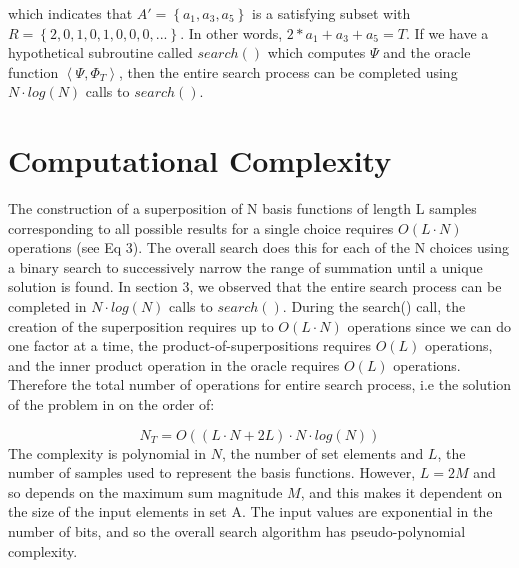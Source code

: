 \documentclass[reqno]{amsart}
\theoremstyle{definition}
\theoremstyle{remark}
\begin{document}
\noindent
which indicates that $A'= \left\{a_1, a_3, a_5 \right\}$ is a satisfying subset with $R = \left\{2,0,1,0,1,0,0,0,...\right\}$. 
In other words, $2*a_1 + a_3 + a_5 = T $. If we have a hypothetical subroutine called $search()$ which computes $\Psi$ and the oracle function
$\left \langle  \Psi, \Phi _T  \right \rangle $, then the entire search process can be completed using $N\cdot log(N)$ calls to $search()$.




\section{Computational Complexity}
The construction of a superposition of N basis functions of length L samples corresponding to all possible results for a single choice requires $O(L\cdot N)$ operations (see Eq 3).  The overall search does this for each of the N choices using a binary search to successively narrow the range of summation until a unique solution is found. In section 3, we observed that the entire search process can be completed in $N\cdot log(N)$ calls to $search()$. During the search() call, the creation of the superposition requires up to $O(L\cdot N)$ operations since we can do one factor at a time, the product-of-superpositions requires $O(L)$ operations, and the inner product operation in the oracle requires $O(L)$ operations. Therefore the total number of operations for entire search process, i.e the solution of the problem in on the order of:

\begin{equation}
N_T = O( (L \cdot N + 2L) \cdot N\cdot log(N) )
\end{equation}
\noindent
The complexity is polynomial in $N$, the number of set elements and $L$, the number of samples used to represent the basis functions. However, $L = 2M$ and so depends on the maximum sum magnitude $M$, and this makes it dependent on the size of the input elements in set A. The input values are exponential in the number of bits, and so the overall search algorithm has pseudo-polynomial complexity.


\newpage
\end{document}
